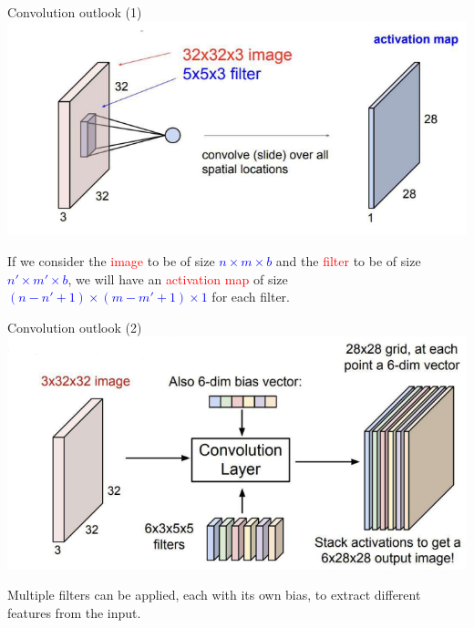 \documentclass[default, aspectratio=169]{beamer}
\begin{document}
	\begin{frame}{Convolution outlook (1)}
		\centering
		\includegraphics[keepaspectratio, scale=0.75]{pic/img5.png}
		\smallskip
		\begin{flushleft}
			If we consider the \textcolor{red}{image} to be of size \textcolor{blue}{\( n \times m \times b \)} and the \textcolor{red}{filter} to be of size \textcolor{blue}{\( n' \times m' \times b \)}, we will have an \textcolor{red}{activation map} of size \textcolor{blue}{\( (n - n' + 1) \times (m - m' + 1) \times 1 \)} for each filter.
		\end{flushleft}
		
	\end{frame}
	\begin{frame}{Convolution outlook (2)}
		\centering
		\includegraphics[keepaspectratio, scale=0.7]{pic/img6.png}
				\smallskip
	\begin{flushleft}
		\small Multiple filters can be applied, each with its own bias, to extract different features from the input.
	\end{flushleft}

	\end{frame}
\end{document}
